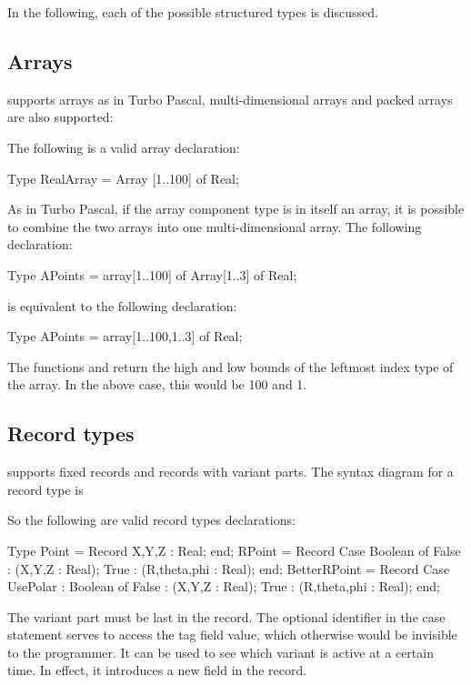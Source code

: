 \documentclass{report}
\begin{document}
In the following, each of the possible structured types is discussed.

\subsection{Arrays}
\fpc supports arrays as in Turbo Pascal, multi-dimensional arrays 
and packed arrays are also supported:



The following is a valid array declaration:
\begin{listing}
Type 
  RealArray = Array [1..100] of Real;
\end{listing}

As in Turbo Pascal, if the array component type is in itself an array, it is
possible to combine the two arrays into one multi-dimensional array. The
following declaration:
\begin{listing}
Type 
   APoints = array[1..100] of Array[1..3] of Real;
\end{listing}
is equivalent to the following declaration:
\begin{listing}
Type 
   APoints = array[1..100,1..3] of Real;
\end{listing}

The functions  and  return the high and low bounds of
the leftmost index type of the array. In the above case, this would be 100 
and 1.

\subsection{Record types}

\fpc supports fixed records and records with variant parts. 
The syntax diagram for a record type is



So the following are valid record types declarations:
\begin{listing}
Type
  Point = Record
          X,Y,Z : Real;
          end;
  RPoint = Record
          Case Boolean of
          False : (X,Y,Z : Real);
          True : (R,theta,phi : Real);
          end;
  BetterRPoint = Record
          Case UsePolar : Boolean of
          False : (X,Y,Z : Real);
          True : (R,theta,phi : Real);
          end;
\end{listing}

The variant part must be last in the record. The optional identifier in the
case statement serves to access the tag field value, which otherwise would
be invisible to the programmer. It can be used to see which variant is 
active at a certain time. In effect, it introduces a new field in the
record.
\end{document}

